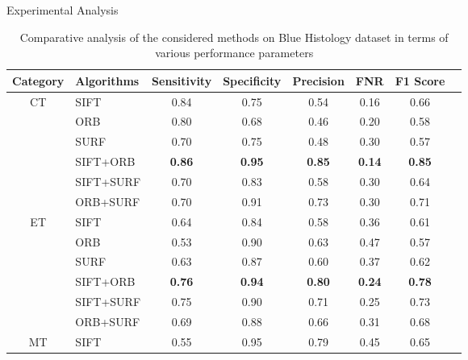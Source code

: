 \documentclass [9pt,times] {beamer}
\begin{document}
\begin{frame}[plain]{Experimental Analysis}
\begin{table}[t!]
\renewcommand{\arraystretch}{1.1}
    \centering
   
    \caption[Comparative analysis of the considered methods on Blue Histology  dataset in terms of various performance parameters]{{ \scriptsize Comparative analysis of the considered methods on Blue Histology  dataset in terms of various performance parameters}}
    \label{tab:tissuepm}
     \scriptsize
    \begin{tabular}{|c|l|c|c|c|c|c|c|}
\hline
\textbf{Category }    &    \textbf{Algorithms}    &    \textbf{Sensitivity}    &    \textbf{Specificity}    &    \textbf{Precision    }&    \textbf{FNR}    &    \textbf{F1 Score}    \\
\hline
CT    &    SIFT    &    0.84    &    0.75    &    0.54    &    0.16    &    0.66    \\
    &    ORB    &    0.80    &    0.68    &    0.46    &    0.20    &    0.58    \\
    &    SURF    &    0.70    &    0.75    &    0.48    &    0.30    &    0.57    \\
    &    SIFT+ORB    &\textbf{    0.86    }&\textbf{    0.95    }&\textbf{    0.85    }&\textbf{    0.14    }&\textbf{    0.85    }\\
    &    SIFT+SURF    &    0.70    &    0.83    &    0.58    &    0.30    &    0.64    \\
    &    ORB+SURF    &    0.70    &    0.91    &    0.73    &    0.30    &    0.71    \\
\hline
ET    &    SIFT    &    0.64    &    0.84    &    0.58    &    0.36    &    0.61    \\
    &    ORB    &    0.53    &    0.90    &    0.63    &    0.47    &    0.57    \\
    &    SURF    &    0.63    &    0.87    &    0.60    &    0.37    &    0.62    \\
    &    SIFT+ORB    &\textbf{    0.76    }&\textbf{    0.94    }&\textbf{    0.80    }&\textbf{    0.24    }&\textbf{    0.78    }\\
    &    SIFT+SURF    &    0.75    &    0.90    &    0.71    &    0.25    &    0.73    \\
    &    ORB+SURF    &    0.69    &    0.88    &    0.66    &    0.31    &    0.68    \\
\hline
MT    &    SIFT    &    0.55    &    0.95    &    0.79    &    0.45    &    0.65    \\

\end{tabular}
\end{table}
\end{frame}
\end{document}
